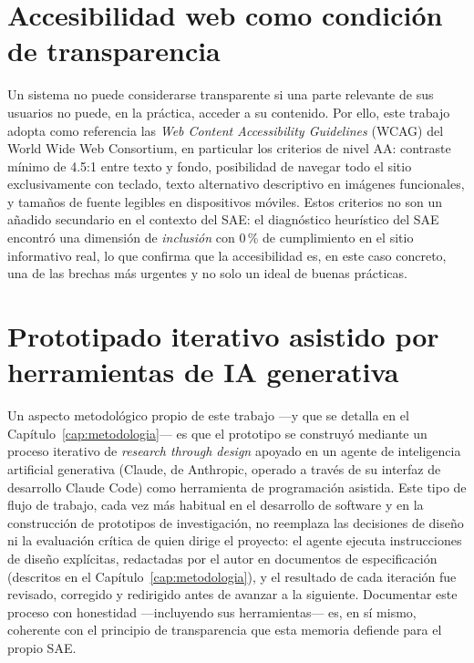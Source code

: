 \section{Accesibilidad web como condición de transparencia}\label{sec:accesibilidad}

Un sistema no puede considerarse transparente si una parte relevante de sus usuarios no puede, en la práctica, acceder a su contenido. Por ello, este trabajo adopta como referencia las \emph{Web Content Accessibility Guidelines} (WCAG) del World Wide Web Consortium, en particular los criterios de nivel AA: contraste mínimo de 4.5:1 entre texto y fondo, posibilidad de navegar todo el sitio exclusivamente con teclado, texto alternativo descriptivo en imágenes funcionales, y tamaños de fuente legibles en dispositivos móviles. Estos criterios no son un añadido secundario en el contexto del SAE: el diagnóstico heurístico del SAE encontró una dimensión de \emph{inclusión} con 0\,\% de cumplimiento en el sitio informativo real, lo que confirma que la accesibilidad es, en este caso concreto, una de las brechas más urgentes y no solo un ideal de buenas prácticas.

\section{Prototipado iterativo asistido por herramientas de IA generativa}\label{sec:prototipado-ia}

Un aspecto metodológico propio de este trabajo —y que se detalla en el Capítulo~\ref{cap:metodologia}— es que el prototipo se construyó mediante un proceso iterativo de \emph{research through design} apoyado en un agente de inteligencia artificial generativa (Claude, de Anthropic, operado a través de su interfaz de desarrollo Claude Code) como herramienta de programación asistida. Este tipo de flujo de trabajo, cada vez más habitual en el desarrollo de software y en la construcción de prototipos de investigación, no reemplaza las decisiones de diseño ni la evaluación crítica de quien dirige el proyecto: el agente ejecuta instrucciones de diseño explícitas, redactadas por el autor en documentos de especificación (descritos en el Capítulo~\ref{cap:metodologia}), y el resultado de cada iteración fue revisado, corregido y redirigido antes de avanzar a la siguiente. Documentar este proceso con honestidad —incluyendo sus herramientas— es, en sí mismo, coherente con el principio de transparencia que esta memoria defiende para el propio SAE.
